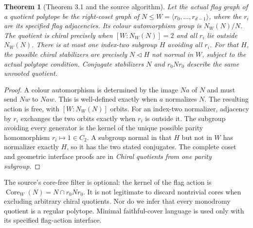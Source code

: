 \documentclass[11pt,a4paper]{article}
\newtheorem{theorem}{Theorem}
\begin{document}
\begin{theorem}[Theorem 3.1 and the source algorithm]
Let the actual flag graph of a quotient polytope be the right-coset graph
of $N\le W=\langle r_0,\ldots,r_{d-1}\rangle$, where the $r_i$ are its
specified flag adjacencies. Its colour automorphism group is $N_W(N)/N$.
The quotient is chiral precisely when $[W:N_W(N)]=2$ and all $r_i$ lie
outside $N_W(N)$. There is at most one index-two subgroup $H$ avoiding all
$r_i$. For that $H$, the possible chiral stabilizers are precisely
$N\lhd H$ not normal in $W$, subject to the actual polytope condition.
Conjugate stabilizers $N$ and $r_0Nr_0$ describe the same unrooted quotient.
\end{theorem}
\begin{proof}
A colour automorphism is determined by the image $Na$ of $N$ and must
send $Nw$ to $Naw$. This is well-defined exactly when $a$ normalizes $N$.
The resulting action is free, with $[W:N_W(N)]$ orbits. For an index-two
normalizer, adjacency by $r_i$ exchanges the two orbits exactly when $r_i$
is outside it. The subgroup avoiding every generator is the kernel of the
unique possible parity homomorphism $r_i\mapsto1\in C_2$. A subgroup normal
in that $H$ but not in $W$ has normalizer exactly $H$, so it has the two
stated conjugates. The complete coset and geometric interface proofs are in
\emph{Chiral quotients from one parity subgroup}.
\end{proof}
The source's core-free filter is optional: the kernel of the flag action is
$\operatorname{Core}_W(N)=N\cap r_0Nr_0$. It is not legitimate to discard
nontrivial cores when excluding arbitrary chiral quotients. Nor do we infer
that every monodromy quotient is a regular polytope. Minimal faithful-cover
language is used only with its specified flag-action interface.
\end{document}
